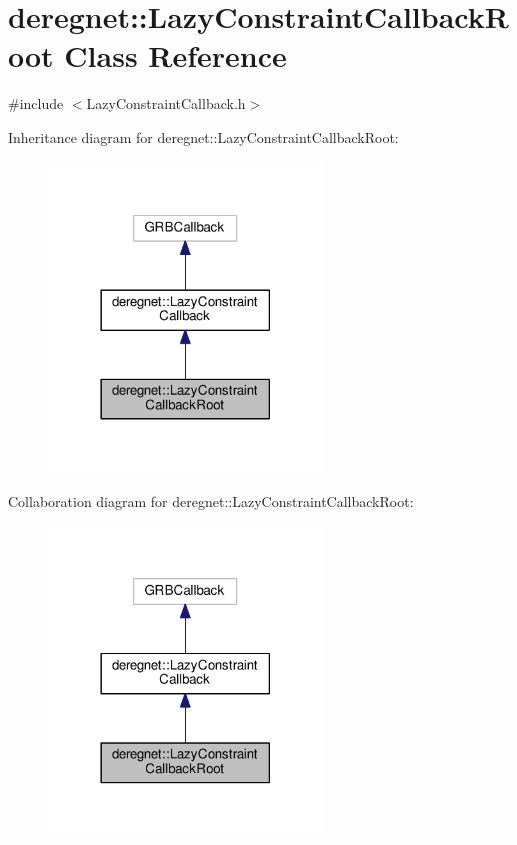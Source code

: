 \hypertarget{classderegnet_1_1LazyConstraintCallbackRoot}{}\section{deregnet\+:\+:Lazy\+Constraint\+Callback\+Root Class Reference}
\label{classderegnet_1_1LazyConstraintCallbackRoot}


{\ttfamily \#include $<$Lazy\+Constraint\+Callback.\+h$>$}



Inheritance diagram for deregnet\+:\+:Lazy\+Constraint\+Callback\+Root\+:\nopagebreak
\begin{figure}[H]
\begin{center}
\leavevmode
\includegraphics[width=206pt]{classderegnet_1_1LazyConstraintCallbackRoot__inherit__graph}
\end{center}
\end{figure}


Collaboration diagram for deregnet\+:\+:Lazy\+Constraint\+Callback\+Root\+:\nopagebreak
\begin{figure}[H]
\begin{center}
\leavevmode
\includegraphics[width=206pt]{classderegnet_1_1LazyConstraintCallbackRoot__coll__graph}
\end{center}
\end{figure}
